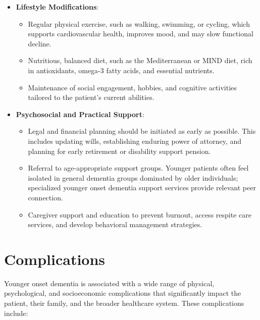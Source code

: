 \begin{itemize}
    \item \textbf{Lifestyle Modifications}:
    \begin{itemize}
        \item Regular physical exercise, such as walking, swimming, or cycling, which supports cardiovascular health, improves mood, and may slow functional decline.
        \item Nutritious, balanced diet, such as the Mediterranean or MIND diet, rich in antioxidants, omega-3 fatty acids, and essential nutrients.
        \item Maintenance of social engagement, hobbies, and cognitive activities tailored to the patient's current abilities.
    \end{itemize}
    \item \textbf{Psychosocial and Practical Support}:
    \begin{itemize}
        \item Legal and financial planning should be initiated as early as possible. This includes updating wills, establishing enduring power of attorney, and planning for early retirement or disability support pension.
        \item Referral to age-appropriate support groups. Younger patients often feel isolated in general dementia groups dominated by older individuals; specialized younger onset dementia support services provide relevant peer connection.
        \item Caregiver support and education to prevent burnout, access respite care services, and develop behavioral management strategies.
    \end{itemize}
\end{itemize}

\section*{Complications}
Younger onset dementia is associated with a wide range of physical, psychological, and socioeconomic complications that significantly impact the patient, their family, and the broader healthcare system. These complications include:

